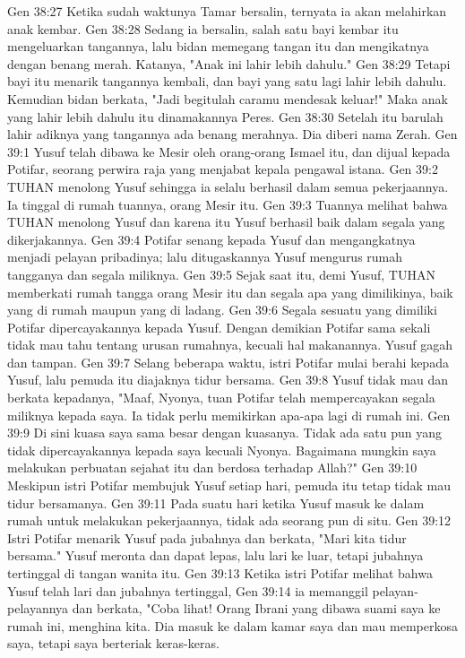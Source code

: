 Gen 38:27  Ketika sudah waktunya Tamar bersalin, ternyata ia akan melahirkan anak kembar.
Gen 38:28  Sedang ia bersalin, salah satu bayi kembar itu mengeluarkan tangannya, lalu bidan memegang tangan itu dan mengikatnya dengan benang merah. Katanya, "Anak ini lahir lebih dahulu."
Gen 38:29  Tetapi bayi itu menarik tangannya kembali, dan bayi yang satu lagi lahir lebih dahulu. Kemudian bidan berkata, "Jadi begitulah caramu mendesak keluar!" Maka anak yang lahir lebih dahulu itu dinamakannya Peres.
Gen 38:30  Setelah itu barulah lahir adiknya yang tangannya ada benang merahnya. Dia diberi nama Zerah.
Gen 39:1  Yusuf telah dibawa ke Mesir oleh orang-orang Ismael itu, dan dijual kepada Potifar, seorang perwira raja yang menjabat kepala pengawal istana.
Gen 39:2  TUHAN menolong Yusuf sehingga ia selalu berhasil dalam semua pekerjaannya. Ia tinggal di rumah tuannya, orang Mesir itu.
Gen 39:3  Tuannya melihat bahwa TUHAN menolong Yusuf dan karena itu Yusuf berhasil baik dalam segala yang dikerjakannya.
Gen 39:4  Potifar senang kepada Yusuf dan mengangkatnya menjadi pelayan pribadinya; lalu ditugaskannya Yusuf mengurus rumah tangganya dan segala miliknya.
Gen 39:5  Sejak saat itu, demi Yusuf, TUHAN memberkati rumah tangga orang Mesir itu dan segala apa yang dimilikinya, baik yang di rumah maupun yang di ladang.
Gen 39:6  Segala sesuatu yang dimiliki Potifar dipercayakannya kepada Yusuf. Dengan demikian Potifar sama sekali tidak mau tahu tentang urusan rumahnya, kecuali hal makanannya. Yusuf gagah dan tampan.
Gen 39:7  Selang beberapa waktu, istri Potifar mulai berahi kepada Yusuf, lalu pemuda itu diajaknya tidur bersama.
Gen 39:8  Yusuf tidak mau dan berkata kepadanya, "Maaf, Nyonya, tuan Potifar telah mempercayakan segala miliknya kepada saya. Ia tidak perlu memikirkan apa-apa lagi di rumah ini.
Gen 39:9  Di sini kuasa saya sama besar dengan kuasanya. Tidak ada satu pun yang tidak dipercayakannya kepada saya kecuali Nyonya. Bagaimana mungkin saya melakukan perbuatan sejahat itu dan berdosa terhadap Allah?"
Gen 39:10  Meskipun istri Potifar membujuk Yusuf setiap hari, pemuda itu tetap tidak mau tidur bersamanya.
Gen 39:11  Pada suatu hari ketika Yusuf masuk ke dalam rumah untuk melakukan pekerjaannya, tidak ada seorang pun di situ.
Gen 39:12  Istri Potifar menarik Yusuf pada jubahnya dan berkata, "Mari kita tidur bersama." Yusuf meronta dan dapat lepas, lalu lari ke luar, tetapi jubahnya tertinggal di tangan wanita itu.
Gen 39:13  Ketika istri Potifar melihat bahwa Yusuf telah lari dan jubahnya tertinggal,
Gen 39:14  ia memanggil pelayan-pelayannya dan berkata, "Coba lihat! Orang Ibrani yang dibawa suami saya ke rumah ini, menghina kita. Dia masuk ke dalam kamar saya dan mau memperkosa saya, tetapi saya berteriak keras-keras.
